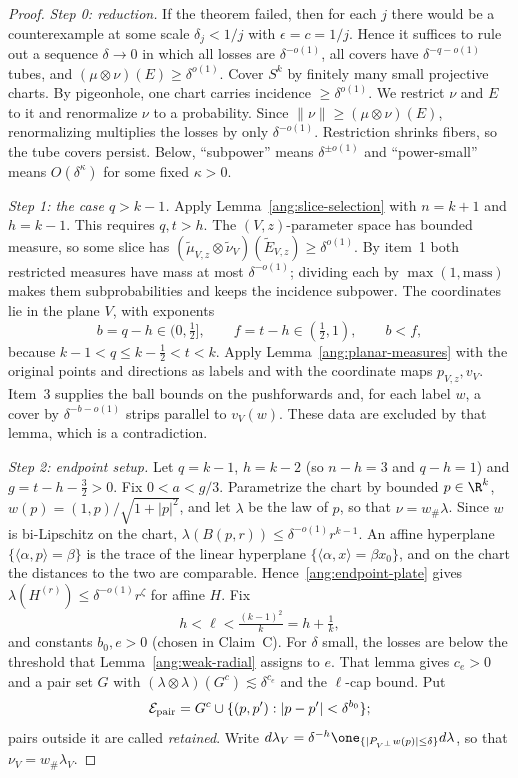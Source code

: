 \begin{proof}
\emph{Step 0: reduction.} If the theorem failed, then for each $j$ there would be a counterexample at some scale $\delta_j<1/j$ with $\epsilon=c=1/j$. Hence it suffices to rule out a sequence $\delta\to0$ in which all losses are $\delta^{-o(1)}$, all covers have $\delta^{-q-o(1)}$ tubes, and $(\mu\otimes\nu)(E)\ge\delta^{o(1)}$. Cover $S^k$ by finitely many small projective charts. By pigeonhole, one chart carries incidence $\ge\delta^{o(1)}$. We restrict $\nu$ and $E$ to it and renormalize $\nu$ to a probability. Since $\|\nu\|\ge(\mu\otimes\nu)(E)$, renormalizing multiplies the losses by only $\delta^{-o(1)}$. Restriction shrinks fibers, so the tube covers persist. Below, ``subpower'' means $\delta^{\pm o(1)}$ and ``power-small'' means $O(\delta^{\kappa})$ for some fixed $\kappa>0$.

\emph{Step 1: the case $q>k-1$.} Apply Lemma~\ref{ang:slice-selection} with $n=k+1$ and $h=k-1$. This requires $q,t>h$. The $(V,z)$-parameter space has bounded measure, so some slice has $(\widetilde\mu_{V,z}\otimes\widetilde\nu_V)(\widetilde E_{V,z})\ge\delta^{o(1)}$. By item~1 both restricted measures have mass at most $\delta^{-o(1)}$; dividing each by $\max(1,\text{mass})$ makes them subprobabilities and keeps the incidence subpower. The coordinates lie in the plane $V$, with exponents
\[
 b=q-h\in(0,\tfrac12],\qquad f=t-h\in(\tfrac12,1),\qquad b<f,
\]
because $k-1<q\le k-\frac12<t<k$. Apply Lemma~\ref{ang:planar-measures} with the original points and directions as labels and with the coordinate maps $p_{V,z},v_V$. Item~3 supplies the ball bounds on the pushforwards and, for each label $w$, a cover by $\delta^{-b-o(1)}$ strips parallel to $v_V(w)$. These data are excluded by that lemma, which is a contradiction.

\emph{Step 2: endpoint setup.} Let $q=k-1$, $h=k-2$ (so $n-h=3$ and $q-h=1$) and $g=t-h-\frac32>0$. Fix $0<a<g/3$. Parametrize the chart by bounded $p\in\R^k$, $w(p)=(1,p)/\sqrt{1+|p|^2}$, and let $\lambda$ be the law of $p$, so that $\nu=w_\#\lambda$. Since $w$ is bi-Lipschitz on the chart, $\lambda(B(p,r))\le\delta^{-o(1)}r^{k-1}$. An affine hyperplane $\{\langle\alpha,p\rangle=\beta\}$ is the trace of the linear hyperplane $\{\langle\alpha,x\rangle=\beta x_0\}$, and on the chart the distances to the two are comparable. Hence~\eqref{ang:endpoint-plate} gives $\lambda(H^{(r)})\le\delta^{-o(1)}r^\zeta$ for affine $H$. Fix
\[
 h<\ell<\tfrac{(k-1)^2}{k}=h+\tfrac1k,
\]
and constants $b_0,e>0$ (chosen in Claim~C). For $\delta$ small, the losses are below the threshold that Lemma~\ref{ang:weak-radial} assigns to $e$. That lemma gives $c_e>0$ and a pair set $G$ with $(\lambda\otimes\lambda)(G^c)\lesssim\delta^{c_e}$ and the $\ell$-cap bound. Put
\[
 \mathcal E_{\rm pair}=G^c\cup\{(p,p'):|p-p'|<\delta^{b_0}\};
\]
pairs outside it are called \emph{retained}. Write $d\lambda_V=\delta^{-h}\one_{\{|P_{V^\perp}w(p)|\le\delta\}}d\lambda$, so that $\nu_V=w_\#\lambda_V$.


\end{proof}
